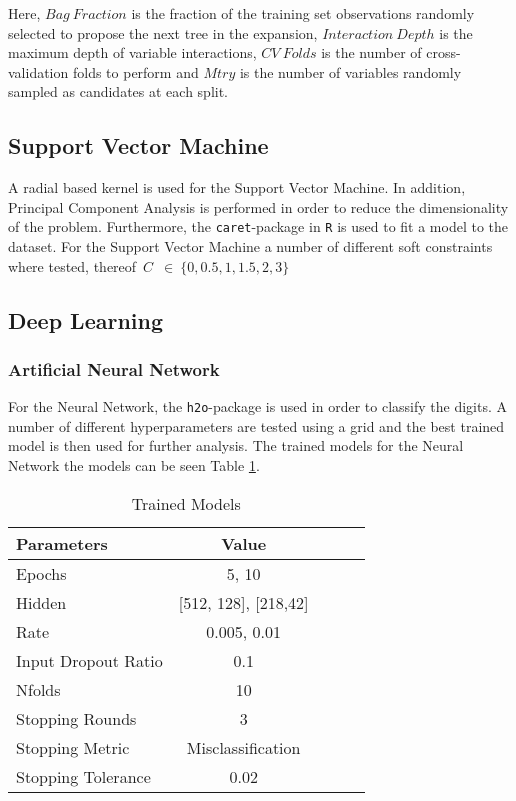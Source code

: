 \documentclass[a4paper,10pt]{article}
\begin{document}
Here, $Bag\ Fraction$ is the fraction of the training set
observations randomly selected to propose the next tree in the expansion, $Interaction\ Depth$ is the maximum depth of variable interactions,
$CV\ Folds$  is the number of cross-validation folds to perform and $Mtry$ is the number of variables randomly sampled as candidates at each split. \newline

\subsection{Support Vector Machine}
A radial based kernel is used for the Support Vector Machine. In addition,
Principal Component Analysis is performed in order to reduce the
dimensionality of the problem. Furthermore, the \texttt{caret}-package in
\texttt{R} is used to fit a model to the dataset. For the Support Vector Machine
a number of different soft constraints where tested,
thereof~$C$~$\in\ \{0, 0.5, 1, 1.5, 2, 3\}$ \\

\subsection{Deep Learning}
\subsubsection{Artificial Neural Network}
For the Neural Network, the \texttt{h2o}-package is used in order to
classify the digits. A number of different hyperparameters are tested
using a grid and the best trained model is then used for further
analysis. The trained models for the  Neural Network the models can
be seen Table {\ref{table:trained_models_nn}}.

\begin{table}[H]
\centering
\begin{tabular}{l*{3}{c}r}
  Parameters & Value \\
  \hline
  Epochs & 5, 10\\
  Hidden & [512, 128], [218,42]\\
  Rate & 0.005, 0.01\\
  Input Dropout Ratio & 0.1\\
  Nfolds & 10\\
  Stopping Rounds & 3\\
  Stopping Metric & Misclassification\\
  Stopping Tolerance & 0.02\\
\end{tabular}
\caption{Trained Models}
\label{table:trained_models_nn}
\end{table}
\end{document}
